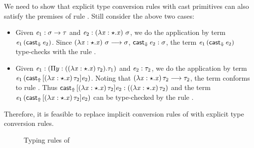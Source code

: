 We need to show that explicit type conversion rules with cast primitives can also satisfy the premises of rule . Still consider the above two cases:
\begin{itemize}
\item Given $\mathit{e_{{\mathrm{1}}}}:\sigma  \rightarrow  \tau$ and $\mathit{e_{{\mathrm{2}}}} : (\lambda  \mathit{x}  :  \star  .  \mathit{x})~\sigma$, we do the application by term $\mathit{e_{{\mathrm{1}}}} \, (  \mathsf{cast}_{\Downarrow} \, \mathit{e_{{\mathrm{2}}}}  )$. Since $(\lambda  \mathit{x}  :  \star  .  \mathit{x})~\sigma  \longrightarrow  \sigma$, $\mathsf{cast}_{\Downarrow} \, \mathit{e_{{\mathrm{2}}}} : \sigma$, the term $\mathit{e_{{\mathrm{1}}}} \, (  \mathsf{cast}_{\Downarrow} \, \mathit{e_{{\mathrm{2}}}}  )$ type-checks with the rule .
\item Given $\mathit{e_{{\mathrm{1}}}} : ( \Pi  y:((  \lambda  \mathit{x}  :  \star  .  \mathit{x}  ) \, \tau_{{\mathrm{2}}}).\tau_{{\mathrm{1}}})$ and $\mathit{e_{{\mathrm{2}}}} : \tau_{{\mathrm{2}}}$, we do the application by term $\mathit{e_{{\mathrm{1}}}} \, (  \mathsf{cast}_{\Uparrow} \, [  (  \lambda  \mathit{x}  :  \star  .  \mathit{x}  ) \, \tau_{{\mathrm{2}}}  ]  \mathit{e_{{\mathrm{2}}}}  )$. Noting that $(  \lambda  \mathit{x}  :  \star  .  \mathit{x}  ) \, \tau_{{\mathrm{2}}}  \longrightarrow  \tau_{{\mathrm{2}}}$, the term conforms to rule . Thus $\mathsf{cast}_{\Uparrow} \, [  (  \lambda  \mathit{x}  :  \star  .  \mathit{x}  ) \, \tau_{{\mathrm{2}}}  ]  \mathit{e_{{\mathrm{2}}}} : (  (  \lambda  \mathit{x}  :  \star  .  \mathit{x}  ) \, \tau_{{\mathrm{2}}}  )$ and the term $\mathit{e_{{\mathrm{1}}}} \, (  \mathsf{cast}_{\Uparrow} \, [  (  \lambda  \mathit{x}  :  \star  .  \mathit{x}  ) \, \tau_{{\mathrm{2}}}  ]  \mathit{e_{{\mathrm{2}}}}  )$ can be type-checked by the rule .
\end{itemize}

Therefore, it is feasible to replace implicit conversion rules of \cc with explicit type conversion rules.

\begin{figure}[ht]
	\ottdefnexpr{}
	\caption{Typing rules of \expcc}
	\label{fig:ecc:typerule}
\end{figure}

